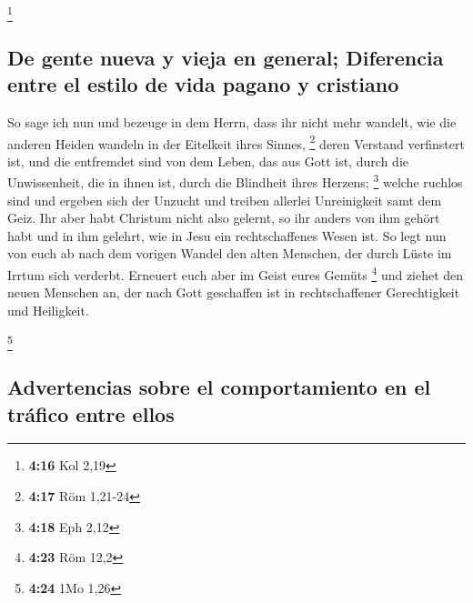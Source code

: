 \footnote{\textbf{4:16} Kol 2,19}

\hypertarget{de-gente-nueva-y-vieja-en-general-diferencia-entre-el-estilo-de-vida-pagano-y-cristiano}{%
\subsection{De gente nueva y vieja en general; Diferencia entre el
estilo de vida pagano y
cristiano}\label{de-gente-nueva-y-vieja-en-general-diferencia-entre-el-estilo-de-vida-pagano-y-cristiano}}

 So sage ich nun und bezeuge in dem Herrn, dass ihr nicht
mehr wandelt, wie die anderen Heiden wandeln in der Eitelkeit ihres
Sinnes, \footnote{\textbf{4:17} Röm 1,21-24}  deren
Verstand verfinstert ist, und die entfremdet sind von dem Leben, das aus
Gott ist, durch die Unwissenheit, die in ihnen ist, durch die Blindheit
ihres Herzens; \footnote{\textbf{4:18} Eph 2,12}  welche
ruchlos sind und ergeben sich der Unzucht und treiben allerlei
Unreinigkeit samt dem Geiz.  Ihr aber habt Christum nicht
also gelernt,  so ihr anders von ihm gehört habt und in
ihm gelehrt, wie in Jesu ein rechtschaffenes Wesen ist. 
So legt nun von euch ab nach dem vorigen Wandel den alten Menschen, der
durch Lüste im Irrtum sich verderbt.  Erneuert euch aber
im Geist eures Gemüts \footnote{\textbf{4:23} Röm 12,2} 
und ziehet den neuen Menschen an, der nach Gott geschaffen ist in
rechtschaffener Gerechtigkeit und Heiligkeit.

\footnote{\textbf{4:24} 1Mo 1,26}

\hypertarget{advertencias-sobre-el-comportamiento-en-el-truxe1fico-entre-ellos}{%
\subsection{Advertencias sobre el comportamiento en el tráfico entre
ellos}\label{advertencias-sobre-el-comportamiento-en-el-truxe1fico-entre-ellos}}

